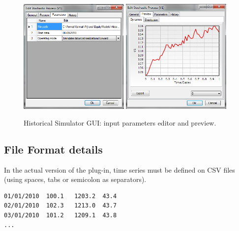 \begin{figure}[h]
\begin{center}
\includegraphics[width=0.48\textwidth]{./figures/HistoricalSimulatorEdit.png}
\includegraphics[width=0.48\textwidth]{./figures/HistoricalSimulatorPreview.png}
\caption{Historical Simulator GUI: input parameters editor and preview.}
\label{fig.HistoricalSimulatorGUI}
\end{center}
\end{figure}

\subsection{File Format details}
In the actual version of the plug-in, time series must be defined on  CSV files (using spaces, tabs or semicolon as separators). 
\begin{small}
\begin{verbatim}
01/01/2010	100.1	1203.2	43.4
02/01/2010	102.3	1213.0	43.7
03/01/2010	101.2	1209.1	43.8
...
\end{verbatim}
\end{small}






